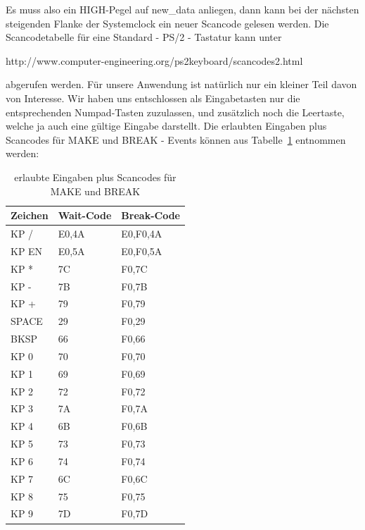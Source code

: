 Es muss also ein HIGH-Pegel auf new\_data anliegen, dann kann bei der nächsten steigenden Flanke der Systemclock ein neuer Scancode gelesen werden.
Die Scancodetabelle für eine Standard - PS/2 - Tastatur kann unter 
\par
http://www.computer-engineering.org/ps2keyboard/scancodes2.html

abgerufen werden. Für unsere Anwendung ist natürlich nur ein kleiner Teil davon von Interesse. Wir haben uns entschlossen als Eingabetasten nur die entsprechenden Numpad-Tasten zuzulassen, und zusätzlich noch die Leertaste, welche ja auch eine gültige Eingabe darstellt. Die erlaubten Eingaben plus Scancodes für MAKE und BREAK - Events können aus Tabelle~\ref{tab:scan_codes} entnommen werden:

\begin{table}[!h]
\begin{center}
\begin{tabular}{|l|l|l|}
\hline
Zeichen & Wait-Code & Break-Code\\
\hline
\hline

KP / & E0,4A & E0,F0,4A	\\
KP EN & E0,5A & E0,F0,5A \\
KP * & 7C & F0,7C \\
KP - & 7B & F0,7B \\
KP + & 79 & F0,79 \\
SPACE & 29 & F0,29 \\
BKSP & 66 & F0,66 \\
KP 0 & 70 & F0,70 \\
KP 1 & 69 & F0,69 \\
KP 2 & 72 & F0,72 \\
KP 3 & 7A & F0,7A \\
KP 4 & 6B & F0,6B \\
KP 5 & 73 & F0,73 \\
KP 6 & 74 & F0,74 \\ 
KP 7 & 6C & F0,6C \\ 
KP 8 & 75 & F0,75 \\
KP 9 & 7D & F0,7D \\
\hline
\end{tabular}
\end{center}
\caption{erlaubte Eingaben plus Scancodes für MAKE und BREAK}
\label{tab:scan_codes}
\end{table}

